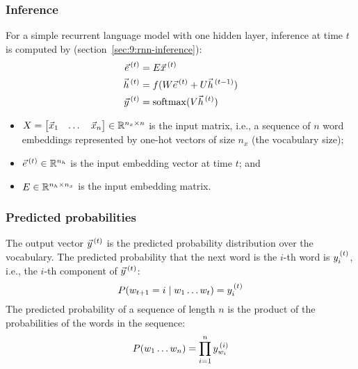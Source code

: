 \subsubsection{Inference}
\label{sec:9:rnn-lm-inference}

For a simple recurrent language model with one hidden layer, inference at time
$t$ is computed by (section~\ref{sec:9:rnn-inference}):
\begin{align}
  \vec{e}^{\,(t)} & = E \vec{x}^{\,(t)}                                       \\
  \vec{h}^{\,(t)} & = f(W \vec{e}^{\,(t)} + U \vec{h}^{\,(t - 1)}) \\
  \vec{y}^{\,(t)} & = \operatorname{softmax}(V \vec{h}^{\,(t)})
\end{align}
\begin{itemize}
  \item $X = \begin{bmatrix} \vec{x}_1 & \dots & \vec{x}_n \end{bmatrix}
          \in \mathbb{R}^{n_x \times n}$ is the input matrix, i.e., a sequence
        of $n$ word embeddings represented by one-hot vectors of size $n_x$ (the
        vocabulary size);
  \item $\vec{e}^{\,(t)} \in \mathbb{R}^{n_h}$ is the input embedding vector at time $t$; and
  \item $E \in \mathbb{R}^{n_h \times n_x}$ is the input embedding matrix.
\end{itemize}

\subsubsection{Predicted probabilities}

The output vector $\vec{y}^{\,(t)}$ is the predicted probability
distribution over the vocabulary.
The predicted probability that the next word is the $i$-th word is
$y_i^{\,(t)}$, i.e., the $i$-th component of $\vec{y}^{\,(t)}$:
\begin{equation}
  P(w_{t + 1} = i \mid w_{1} \dots w_{t}) = y_i^{\,(t)}
\end{equation}
The predicted probability of a sequence of length $n$ is the product of the
probabilities of the words in the sequence:
\begin{equation}
  P(w_{1} \dots w_{n}) = \prod_{i = 1}^n y_{w_i}^{\,(i)}
\end{equation}

